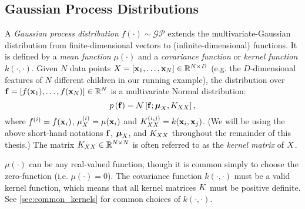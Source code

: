 \subsection{Gaussian Process Distributions}
A \emph{Gaussian process distribution} $f(\cdot) \sim \mathcal{GP}$ extends the multivariate-Gaussian distribution from finite-dimensional vectors to (infinite-dimensional) functions.
It is defined by a \emph{mean function} $\mu(\cdot)$ and a \emph{covariance function} or \emph{kernel function} $k(\cdot, \cdot)$.
Given $N$ data points $X = [ \mathbf{x}_1, \ldots, \mathbf{x}_N ] \in \mathbb{R}^{N \times D}$ (e.g. the $D$-dimensional features of $N$ different children in our running example),
the distribution over $\mathbf{f} = [ f(\mathbf{x}_1), \ldots, f(\mathbf{x}_N) ] \in \mathbb{R}^{N}$ is a multivariate Normal distribution:
\begin{equation}
 p \left( \mathbf{f} \right) = \mathcal{N} \left[  \mathbf{f} ; \boldsymbol{\mu}_{X},  K_{XX}  \right],
 \label{eqn:prior_finite}
\end{equation}
where $f^{(i)} = f(\mathbf{x}_i)$, $\mu^{(i)}_{X} = \mu( \mathbf{x}_i )$ and $K_{XX}^{(i,j)} = k(\mathbf{x}_i, \mathbf{x}_j)$.
(We will be using the above short-hand notations $\mathbf{f}$, $\boldsymbol{\mu}_{X}$, and $K_{XX}$ throughout the remainder of this thesis.)
The matrix $K_{XX} \in \mathbb{R}^{N \times N}$ is often referred to as the \emph{kernel matrix} of $X$.

$\mu(\cdot)$ can be any real-valued function, though it is common simply to choose the zero-function (i.e. $\mu(\cdot) = 0$).
The covariance function $k(\cdot, \cdot)$ must be a valid kernel function, which means that all kernel matrices $K$ must be positive definite.
See \autoref{sec:common_kernels} for common choices of $k(\cdot, \cdot)$.


